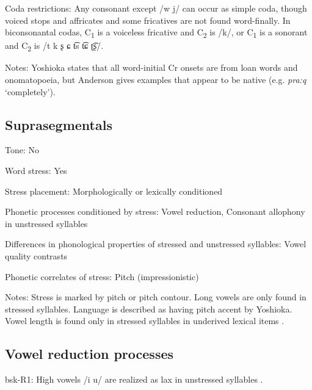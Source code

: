 {\begin{appendixdesc}
\item[Coda restrictions:] Any consonant except /w j/ can occur as simple coda, though voiced stops and affricates and some fricatives are not found word-finally. In biconsonantal codas, C\textsubscript{1} is a voiceless fricative and C\textsubscript{2} is /k/, or C\textsubscript{1} is a sonorant and C\textsubscript{2} is /t k ʂ ɕ t͡s t͡ɕ ʈ͡ʂ/. 

\item[Notes:] Yoshioka states that all word-initial Cr onsets are from loan words and onomatopoeia, but Anderson gives examples that appear to be native (e.g. \textit{pra:q} ‘completely’).
\end{appendixdesc}
\subsection*{Suprasegmentals}
\begin{appendixdesc}
\item[Tone:] No

\item[Word stress:] Yes

\item[Stress placement:] Morphologically or lexically conditioned

\item[Phonetic processes conditioned by stress:] Vowel reduction, Consonant allophony in unstressed syllables

\item[Differences in phonological properties of stressed and unstressed syllables:] Vowel quality contrasts

\item[Phonetic correlates of stress:] Pitch (impressionistic)

\item[Notes:] Stress is marked by pitch or pitch contour. Long vowels are only found in stressed syllables. Language is described as having pitch accent by Yoshioka. Vowel length is found only in stressed syllables in underived lexical items \citep[1028]{Anderson1997}.
\end{appendixdesc}
\subsection*{Vowel reduction processes}
\begin{appendixdesc}

\item[bsk-R1:] High vowels /i u/ are realized as lax in unstressed syllables \citep[1029]{Anderson1997}.


\end{appendixdesc}}
